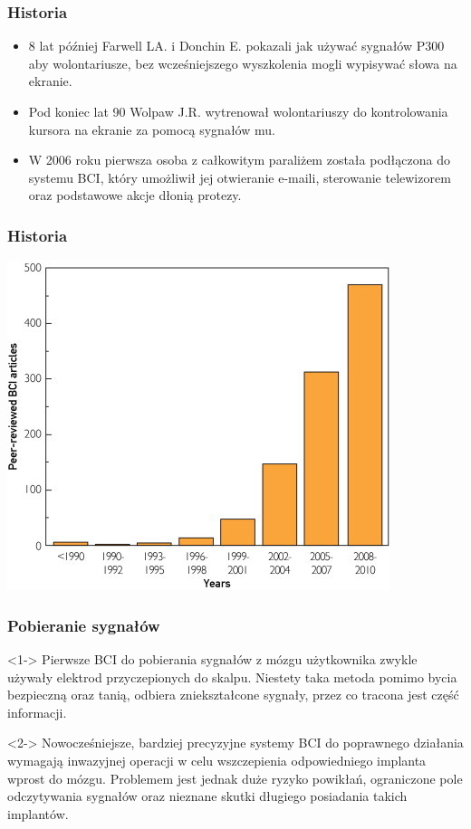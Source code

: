 \documentclass{beamer}
\begin{document}
\begin{frame}
    \frametitle{Historia}
    \begin{itemize}
        \item <1-> 8 lat później Farwell LA. i Donchin E. pokazali jak używać sygnałów P300 aby wolontariusze, bez wcześniejszego wyszkolenia mogli wypisywać słowa na ekranie.
        \item <2-> Pod koniec lat 90 Wolpaw J.R. wytrenował wolontariuszy do kontrolowania kursora na ekranie za pomocą sygnałów mu.
        \item <3-> W 2006 roku pierwsza osoba z całkowitym paraliżem została podłączona do systemu BCI, który umożliwił jej otwieranie e-maili, sterowanie telewizorem oraz podstawowe akcje dłonią protezy.         
    \end{itemize}
\end{frame}
\begin{frame}
\frametitle{Historia}
\begin{center}
    \includegraphics[scale=0.8]{chart.jpg}
\end{center}    
\end{frame}

\begin{frame}
    \frametitle{Pobieranie sygnałów}
        \begin{block}{}<1->
            Pierwsze BCI do pobierania sygnałów z mózgu użytkownika zwykle używały elektrod przyczepionych do skalpu.
            Niestety taka metoda pomimo bycia bezpieczną oraz tanią, odbiera zniekształcone sygnały, przez co tracona jest część informacji.
        \end{block}
        \begin{block}{}<2->
                Nowocześniejsze, bardziej precyzyjne systemy BCI do poprawnego działania wymagają inwazyjnej operacji w celu
                wszczepienia odpowiedniego implanta wprost do mózgu. Problemem jest jednak duże ryzyko powikłań, ograniczone
                pole odczytywania sygnałów oraz nieznane skutki długiego posiadania takich implantów.
        \end{block}
\end{frame}
\end{document}
